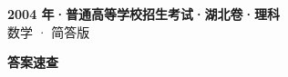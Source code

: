 \documentclass[zihao=-4, a4paper]{ctexart}
\begin{document}
\begin{center}
  {\Large\bfseries 2004 年·普通高等学校招生考试·湖北卷·理科}\\[4pt]
  {\large 数学 · 简答版}
\end{center}
\medskip
{}

\clearpage
{}
\begin{center}{\Large\bfseries 答案速查}\end{center}
\medskip

\end{document}
